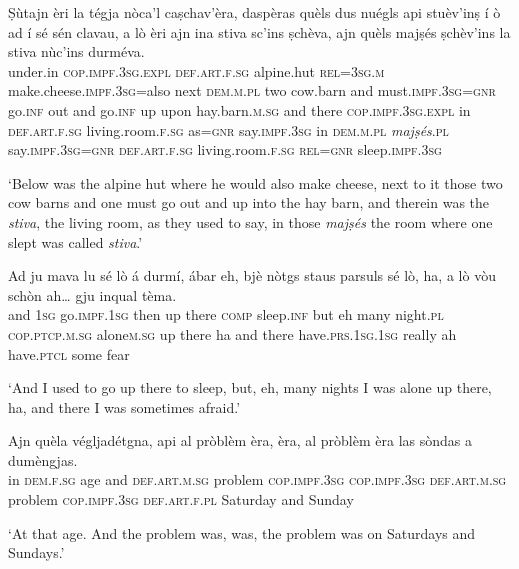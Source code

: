 \begin{linenumbers}
\gll Ṣùtajn èri la tégja nòca’l caṣchav'èra, daspèras quèls dus nuégls api stuèv'inṣ í ò ad í sé sén clavau, a lò èri ajn ina stiva sc’ins ṣchèva, ajn quèls majṣés ṣchèv’ins la stiva nùc’ins durméva.   \\
under.in \textsc{cop.impf.3sg.expl} \textsc{def.art.f.sg} alpine.hut \textsc{rel=3sg.m} make.cheese.\textsc{impf.3sg}=also next  \textsc{dem.m.pl} two cow.barn and must.\textsc{impf.3sg}=\textsc{gnr} go.\textsc{inf} out and go.\textsc{inf} up upon hay.barn.\textsc{m.sg} and there  \textsc{cop.impf.3sg.expl} in \textsc{def.art.f.sg} living.room.\textsc{f.sg} as=\textsc{gnr} say.\textsc{impf.3sg} in \textsc{dem.m.pl} \textit{majṣés}.\textsc{pl} say.\textsc{impf.3sg=gnr} \textsc{def.art.f.sg} living.room.\textsc{f.sg}  \textsc{rel=gnr} sleep.\textsc{impf.3sg}\\
\end{linenumbers}
\medskip
\glt `Below was the alpine hut where he would also make cheese, next to it those two cow barns and one must go out and up into the hay barn, and therein was the \textit{stiva}, the living room, as they used to say, in those \textit{majṣés} the room where one slept was called \textit{stiva}.'
\medskip

\begin{linenumbers}
\gll  Ad ju mava lu sé lò á durmí, ábar eh, bjè nòtgs staus parsuls sé lò, ha, a lò vòu schòn ah… gju inqual tèma.   \\
and  \textsc{1sg} go.\textsc{impf.1sg} then up there  \textsc{comp} sleep.\textsc{inf} but eh many night.\textsc{pl} \textsc{cop.ptcp.m.sg} alone\textsc{m.sg} up there ha and there have.\textsc{prs.1sg.1sg} really  ah have.\textsc{ptcl} some fear \\
\end{linenumbers}
\medskip
\glt `And I used to go up there to sleep, but, eh, many nights I was alone up there, ha, and there I was sometimes afraid.'
\medskip

\begin{linenumbers}
\gll  Ajn quèla végljadétgna, api al pròblèm èra, èra, al pròblèm èra las sòndas a dumèngjas.   \\
in  \textsc{dem.f.sg} age and  \textsc{def.art.m.sg} problem \textsc{cop.impf.3sg} \textsc{cop.impf.3sg} \textsc{def.art.m.sg} problem \textsc{cop.impf.3sg} \textsc{def.art.f.pl} Saturday and Sunday \\
\end{linenumbers}
\medskip
\glt `At that age. And the problem was, was, the problem was on Saturdays and Sundays.'
\medskip


